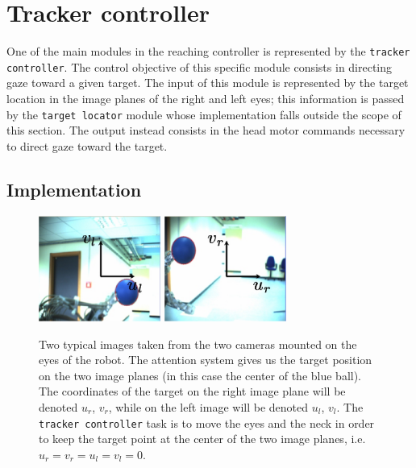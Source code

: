\section{Tracker controller}
\label{Sec:TrackerController}

One of the main modules in the reaching controller is represented by the {\tt tracker controller}. The control objective of this specific module consists in directing gaze toward a given target. The input of this module is represented by the target location in the image planes of the right and left eyes; this information is passed by the {\tt target locator} module whose implementation falls outside the scope of this section. The output instead consists in the head motor commands necessary to direct gaze toward the target. 

\subsection{Implementation}

\begin{figure}[tbp]
\centering
\includegraphics[width=40mm]{Figure/LeftImage.eps} \hspace{1cm}
\includegraphics[width=40mm]{Figure/RightImage.eps}
\caption{Two typical images taken from the two cameras mounted on the eyes of the robot. The attention system gives us the target position on the two image planes (in this case the center of the blue ball). The coordinates of the target on the right image plane will be denoted $u_r$, $v_r$, while on the left image will be denoted $u_l$, $v_l$. The {\tt tracker controller} task is to move the eyes and the neck in order to keep the target point at the center of the two image planes, i.e. $u_r = v_r = u_l = v_l = 0$.}
\label{Fig:ImagePlane}
\end{figure}


